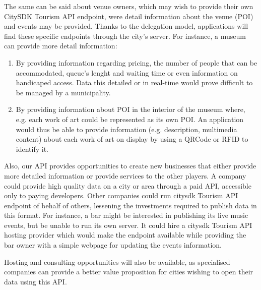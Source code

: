 \documentclass[times,doublespace]{ettauth}%
\begin{document}
The same can be said about venue owners, which may wish to provide their own CitySDK Tourism API endpoint, were detail information about the venue (\ac{POI}) and events may be provided.
Thanks to the delegation model, applications will find these specific endpoints through the city's server.
For instance, a museum can provide more detail information: 
\begin{enumerate}
\item By providing information regarding pricing, the number of people that can be accommodated, queue's lenght and waiting time or even information on handicaped access. Data this detailed or in real-time would prove difficult to be managed by a municipality.
\item By providing information about \ac{POI} in the interior of the museum where, e.g. each work of art could be represented as its own \ac{POI}. An application would thus be able to provide information (e.g. description, multimedia content) about each work of art on display by using a QRCode or RFID to identify it.
\end{enumerate} 

Also, our API provides opportunities to create new businesses that either provide more detailed information or provide services to the other players.
A company could provide high quality data on a city or area through a paid API, accessible only to paying developers.
Other companies could run \ac{citysdk} Tourism API endpoint of behalf of others, lessening the investments required to publish data in this format.
For instance, a bar might be interested in publishing its live music events, but be unable to run its own server.
It could hire a \ac{citysdk} Tourism API hosting provider which would make the endpoint available while providing the bar owner with a simple webpage for updating the events information.

Hosting and consulting opportunities will also be available, as specialised companies can provide a better value proposition for cities wishing to open their data using this API.


\end{document}
